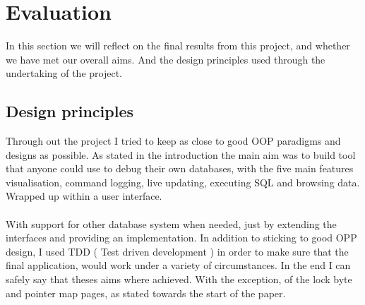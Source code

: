 %
%
%
%
%
%

\section{Evaluation}
\label{sec:evaluation}

In this section we will reflect on the final results from this project, and whether we have met our overall aims. And the design principles used through the undertaking of the project.

\subsection{Design principles}
\label{subsec:design_principles}

Through out the project I tried to keep as close to good OOP paradigms and designs as possible. As stated in the introduction the main aim was to build tool that anyone could use to debug their own databases, with the five main features visualisation, command logging, live updating, executing SQL and browsing data. Wrapped up within a user interface. 
\\\\
With support for other database system when needed, just by extending the interfaces and providing an implementation. In addition to sticking to good OPP design, I used TDD ( Test driven development ) in order to make sure that the final application, would work under a variety of circumstances. In the end I can safely say that theses aims where achieved. With the exception, of the lock byte and pointer map pages, as stated towards the start of the paper. 


